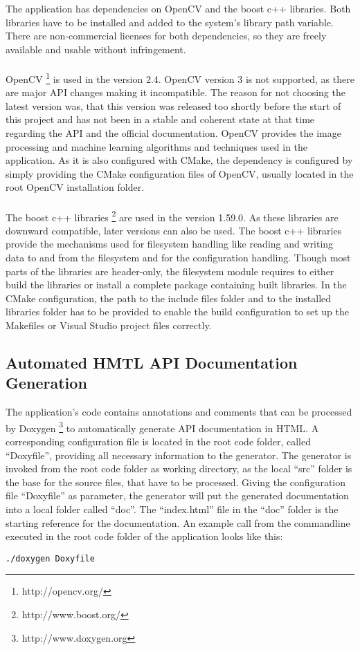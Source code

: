 The application has dependencies on OpenCV and the boost c++ libraries. Both libraries have to be installed and added to the system's library path variable. There are non-commercial licenses for both dependencies, so they are freely available and usable without infringement.
\\
\\
OpenCV \footnote{http://opencv.org/} is used in the version 2.4. OpenCV version 3 is not supported, as there are major API changes making it incompatible. The reason for not choosing the latest version was, that this version was released too shortly before the start of this project and has not been in a stable and coherent state at that time regarding the API and the official documentation. OpenCV provides the image processing and machine learning algorithms and techniques used in the application. As it is also configured with CMake, the dependency is configured by simply providing the CMake configuration files of OpenCV, usually located in the root OpenCV installation folder.
\\
\\
The boost c++ libraries \footnote{http://www.boost.org/} are used in the version 1.59.0. As these libraries are downward compatible, later versions can also be used. The boost c++ libraries provide the mechanisms used for filesystem handling like reading and writing data to and from the filesystem and for the configuration handling. Though most parts of the libraries are header-only, the filesystem module requires to either build the libraries or install a complete package containing built libraries. In the CMake configuration, the path to the include files folder and to the installed libraries folder has to be provided to enable the build configuration to set up the Makefiles or Visual Studio project files correctly.


\subsection{Automated HMTL API Documentation Generation}

The application's code contains annotations and comments that can be processed by Doxygen \footnote{http://www.doxygen.org} to automatically generate API documentation in HTML. A corresponding configuration file is located in the root code folder, called "`Doxyfile"', providing all necessary information to the generator. The generator is invoked from the root code folder as working directory, as the local "`src"' folder is the base for the source files, that have to be processed. Giving the configuration file "`Doxyfile"' as parameter, the generator will put the generated documentation into a local folder called "`doc"'. The "`index.html"' file in the "`doc"' folder is the starting reference for the documentation. An example call from the commandline executed in the root code folder of the application looks like this:
\begin{verbatim}
./doxygen Doxyfile
\end{verbatim}


